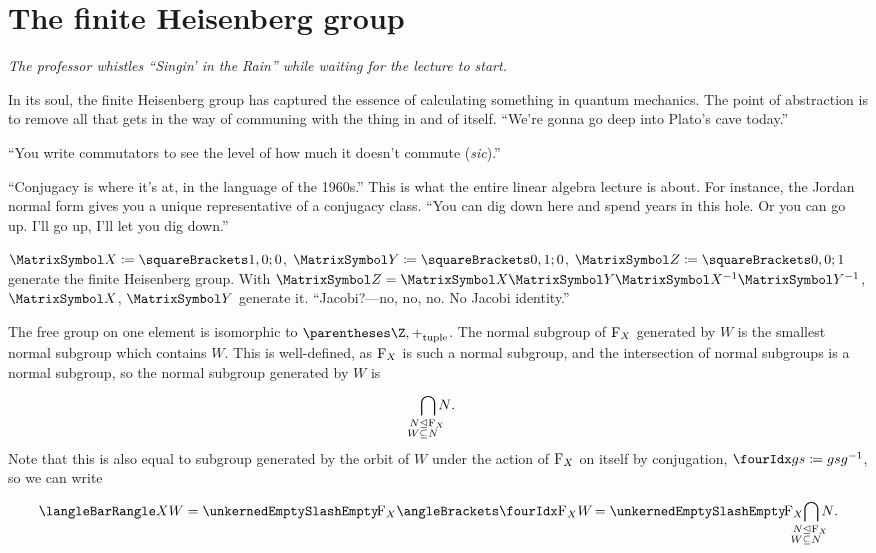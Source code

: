 \documentclass[10pt, a4paper, twoside]{lecturenotes}
\begin{document}
\section{The finite Heisenberg group}
\begin{lecture}[date=2013-03-14, official=true]
\emph{The professor whistles ``Singin' in the Rain'' while waiting for the lecture to start.}

In its soul, the finite Heisenberg group has captured the essence of calculating something in quantum mechanics. The point of abstraction is to remove all that gets in the way of communing with the thing in and of itself. 
``We're gonna go deep into Plato's cave today.''

``You write commutators to see the level of how much it doesn't commute (\emph{sic}).''

 ``Conjugacy is where it's at, in the language of the 1960s.'' This is what the entire linear algebra lecture is about. For instance, the Jordan normal form gives you a unique representative of a conjugacy class. ``You can dig down here and spend years in this hole. Or you can go up. I'll go up, I'll let you dig down.''

$\matX\DefineAs\Helt 1 0 0$, $\matY\DefineAs\Helt 0 1 0$, $\matZ\DefineAs\Helt 0 0 1$ generate the finite Heisenberg group. With $\matZ=\matX\matY\matX^{-1}\matY^{-1}$, $\matX$, $\matY$ generate it. ``Jacobi?---no, no, no. No Jacobi identity.'' 

The free group on one element is isomorphic to $\tuple{\Z,+}$. The normal subgroup of $\operatorname{F}_{X}$ generated by $W$ is the smallest normal subgroup which contains $W$. This is well-defined, as $\operatorname{F}_{X}$ is such a normal subgroup, and the intersection of normal subgroups is a normal subgroup, so the normal subgroup generated by $W$ is
\begin{equation*}
  \IntersectionOver {
    \LongDomainSpec{
      \mathllap{N\NormalSubgroup} \mathrlap{\FreeGroup X}\\
      \mathllap{W\Subset} \mathrlap{N}
    }
  } N\text{.}
\end{equation*}
Note that this is also equal to subgroup generated by the orbit of $W$ under the action of $\operatorname{F}_{X}$ on itself by conjugation, $\LeftConjugationAction g s \DefineAs g s g^{-1}$, so we can write
\begin{equation*}
\GroupPresentation{X}{W} = \QuotientGroup{\FreeGroup X}{\GroupGeneratedBy{\LeftConjugationAction {\FreeGroup X} W}} = \QuotientGroup{\FreeGroup X}{
  \IntersectionOver {
    \LongDomainSpec{
      \mathllap{N\NormalSubgroup} \mathrlap{\FreeGroup X}\\
      \mathllap{W\Subset} \mathrlap{N}
    }
  } N\text{.}
}
\end{equation*}


\end{lecture}
\end{document}
